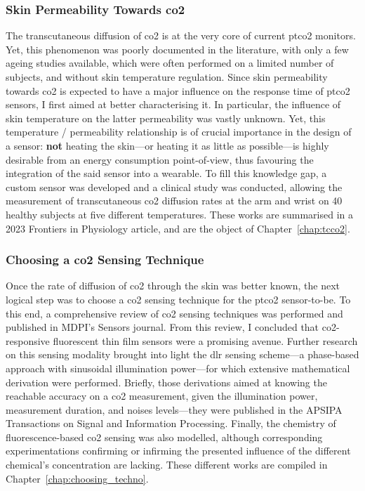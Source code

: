 \subsubsection{Skin Permeability Towards \texorpdfstring{\gls{co2}}{CO2}}

The transcutaneous diffusion of \gls{co2} is at the very core of current \gls{ptco2} monitors. Yet, this phenomenon was poorly documented in the literature, with only a few ageing studies available, which were often performed on a limited number of subjects, and without skin temperature regulation. Since skin permeability towards \gls{co2} is expected to have a major influence on the response time of \gls{ptco2} sensors, I first aimed at better characterising it. In particular, the influence of skin temperature on the latter permeability was vastly unknown. Yet, this temperature / permeability relationship is of crucial importance in the design of a sensor: \textbf{not} heating the skin---or heating it as little as possible---is highly desirable from an energy consumption point-of-view, thus favouring the integration of the said sensor into a wearable. To fill this knowledge gap, a custom sensor was developed and a clinical study was conducted, allowing the measurement of transcutaneous \gls{co2} diffusion rates at the arm and wrist on 40 healthy subjects at five different temperatures. These works are summarised in a 2023 Frontiers in Physiology article\cite{dervieux2023rate}, and are the object of Chapter~\ref{chap:tcco2}.

\subsubsection{Choosing a \texorpdfstring{\gls{co2}}{CO2} Sensing Technique}

Once the rate of diffusion of \gls{co2} through the skin was better known, the next logical step was to choose a \gls{co2} sensing technique for the \gls{ptco2} sensor-to-be. To this end, a comprehensive review of \gls{co2} sensing techniques was performed and published in MDPI's Sensors journal\cite{dervieux2022}. From this review, I concluded that \gls{co2}-responsive fluorescent thin film sensors were a promising avenue. Further research on this sensing modality brought into light the \gls{dlr} sensing scheme---a phase-based approach with sinusoidal illumination power\cite{klimant2001_pap}---for which extensive mathematical derivation were performed. Briefly, those derivations aimed at knowing the reachable accuracy on a \gls{co2} measurement, given the illumination power, measurement duration, and noises levels---they were published in the 
APSIPA Transactions on Signal and Information Processing\cite{dervieux2024phase}. Finally, the chemistry of fluorescence-based \gls{co2} sensing was also modelled, although corresponding experimentations confirming or infirming the presented influence of the different chemical's concentration are lacking. These different works are compiled in Chapter~\ref{chap:choosing_techno}.

